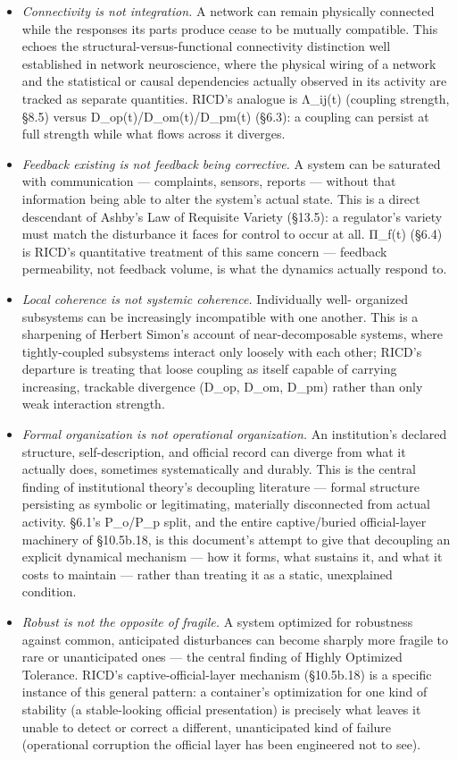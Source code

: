 \documentclass[
]{article}
\begin{document}
\begin{itemize}
\item
  \emph{Connectivity is not integration.} A network can remain
  physically connected while the responses its parts produce cease to be
  mutually compatible. This echoes the structural-versus-functional
  connectivity distinction well established in network neuroscience,
  where the physical wiring of a network and the statistical or causal
  dependencies actually observed in its activity are tracked as separate
  quantities. RICD's analogue is Λ\_ij(t) (coupling strength, §8.5)
  versus D\_op(t)/D\_om(t)/D\_pm(t) (§6.3): a coupling can persist at
  full strength while what flows across it diverges.
\item
  \emph{Feedback existing is not feedback being corrective.} A system
  can be saturated with communication --- complaints, sensors, reports
  --- without that information being able to alter the system's actual
  state. This is a direct descendant of Ashby's Law of Requisite Variety
  (§13.5): a regulator's variety must match the disturbance it faces for
  control to occur at all. Π\_f(t) (§6.4) is RICD's quantitative
  treatment of this same concern --- feedback permeability, not feedback
  volume, is what the dynamics actually respond to.
\item
  \emph{Local coherence is not systemic coherence.} Individually well-
  organized subsystems can be increasingly incompatible with one
  another. This is a sharpening of Herbert Simon's account of
  near-decomposable systems, where tightly-coupled subsystems interact
  only loosely with each other; RICD's departure is treating that loose
  coupling as itself capable of carrying increasing, trackable
  divergence (D\_op, D\_om, D\_pm) rather than only weak interaction
  strength.
\item
  \emph{Formal organization is not operational organization.} An
  institution's declared structure, self-description, and official
  record can diverge from what it actually does, sometimes
  systematically and durably. This is the central finding of
  institutional theory's decoupling literature --- formal structure
  persisting as symbolic or legitimating, materially disconnected from
  actual activity. §6.1's P\_o/P\_p split, and the entire captive/buried
  official-layer machinery of §10.5b.18, is this document's attempt to
  give that decoupling an explicit dynamical mechanism --- how it forms,
  what sustains it, and what it costs to maintain --- rather than
  treating it as a static, unexplained condition.
\item
  \emph{Robust is not the opposite of fragile.} A system optimized for
  robustness against common, anticipated disturbances can become sharply
  more fragile to rare or unanticipated ones --- the central finding of
  Highly Optimized Tolerance. RICD's captive-official-layer mechanism
  (§10.5b.18) is a specific instance of this general pattern: a
  container's optimization for one kind of stability (a stable-looking
  official presentation) is precisely what leaves it unable to detect or
  correct a different, unanticipated kind of failure (operational
  corruption the official layer has been engineered not to see).
\end{itemize}
\end{document}
